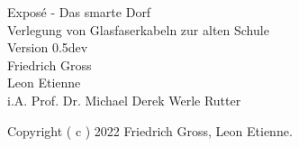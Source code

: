 %
%

\begin{titlepage}
	\begin{center}
		\Huge
			Exposé - Das smarte Dorf \\
		\vspace{5mm}
		\normalsize
		Verlegung von Glasfaserkabeln zur alten Schule\\
		\vspace{1cm}
		\large
		Version 0.5dev\\
		\vspace {2 cm }
		Friedrich Gross \\
		Leon Etienne \\
		\vspace{1em}
		i.A. Prof. Dr. Michael Derek Werle Rutter 
	\end{center}
	\normalsize
	\vfill
	Copyright ( c ) 2022 Friedrich Gross, Leon Etienne.
\end{titlepage}
